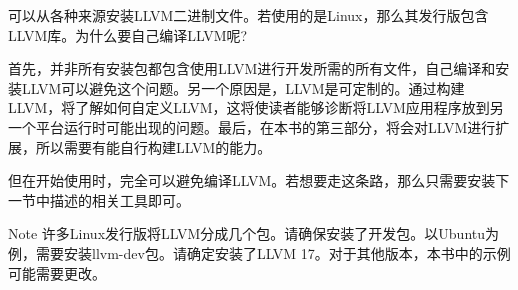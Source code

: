 可以从各种来源安装LLVM二进制文件。若使用的是Linux，那么其发行版包含LLVM库。为什么要自己编译LLVM呢?

首先，并非所有安装包都包含使用LLVM进行开发所需的所有文件，自己编译和安装LLVM可以避免这个问题。另一个原因是，LLVM是可定制的。通过构建LLVM，将了解如何自定义LLVM，这将使读者能够诊断将LLVM应用程序放到另一个平台运行时可能出现的问题。最后，在本书的第三部分，将会对LLVM进行扩展，所以需要有能自行构建LLVM的能力。

但在开始使用时，完全可以避免编译LLVM。若想要走这条路，那么只需要安装下一节中描述的相关工具即可。

\begin{myNotic}{Note}
许多Linux发行版将LLVM分成几个包。请确保安装了开发包。以Ubuntu为例，需要安装llvm-dev包。请确定安装了LLVM 17。对于其他版本，本书中的示例可能需要更改。
\end{myNotic}